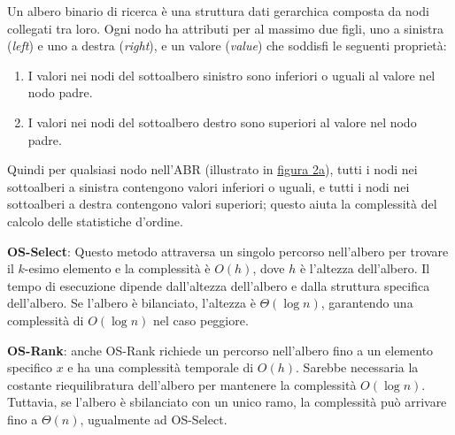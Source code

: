 \documentclass[onecolumn]{article}
\begin{document}
Un albero binario di ricerca è una struttura dati gerarchica composta da nodi collegati tra loro. Ogni nodo ha attributi per al massimo due figli, uno a sinistra (\textit{left}) e uno a destra (\textit{right}), e un valore (\textit{value}) che soddisfi le seguenti proprietà:

\begin{enumerate}
	\setlength\itemsep{-0.25em}
	\item I valori nei nodi del sottoalbero sinistro sono inferiori o uguali al valore nel nodo padre.
	\item I valori nei nodi del sottoalbero destro sono superiori al valore nel nodo padre.
\end{enumerate}

Quindi per qualsiasi nodo nell'ABR (illustrato in \hyperref[fig:alberi]{figura 2a}), tutti i nodi nei sottoalberi a sinistra contengono valori inferiori o uguali, e tutti i nodi nei sottoalberi a destra contengono valori superiori; questo aiuta la complessità del calcolo delle statistiche d'ordine. \vspace{1em}

\textbf{OS-Select}: Questo metodo attraversa un singolo percorso nell'albero per trovare il $k$-esimo elemento e la complessità è $O(h)$, dove $h$ è l'altezza dell'albero. Il tempo di esecuzione dipende dall'altezza dell'albero e dalla struttura specifica dell'albero. Se l'albero è bilanciato, l'altezza è $\Theta(\log n)$, garantendo una complessità di $O(\log n)$ nel caso peggiore. \vspace{0.5em}

\textbf{OS-Rank}: anche OS-Rank richiede un percorso nell'albero fino a un elemento specifico $x$ e ha una complessità temporale di $O(h)$. Sarebbe necessaria la costante riequilibratura dell'albero per mantenere la complessità $O(\log n)$. Tuttavia, se l'albero è sbilanciato con un unico ramo, la complessità può arrivare fino a $\Theta(n)$, ugualmente ad OS-Select.
\end{document}
